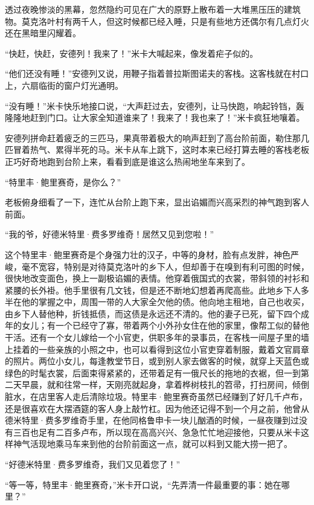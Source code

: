 \par 透过夜晚惨淡的黑幕，忽然隐约可见在广大的原野上散布着一大堆黑压压的建筑物。莫克洛叶村有两千人，但这时候都已经入睡，只是有些地方还偶尔有几点灯火还在黑暗里闪耀着。
\par “快赶，快赶，安德列！我来了！”米卡大喊起来，像发着疟子似的。
\par “他们还没有睡！”安德列又说，用鞭子指着普拉斯图诺夫的客栈。这客栈就在村口上，六扇临街的窗户灯光通明。
\par “没有睡！”米卡快乐地接口说，“大声赶过去，安德列，让马快跑，响起铃铛，轰隆隆地赶到门口。让大家全知道谁来了！我来了！我也来了！”米卡疯狂地嚷着。
\par 安德列拼命赶着疲乏的三匹马，果真带着极大的响声赶到了高台阶前面，勒住那几匹冒着热气、累得半死的马。米卡从车上跳下，这时本来已经打算去睡的客栈老板正巧好奇地跑到台阶上来，看看到底是谁这么热闹地坐车来到了。
\par “特里丰·鲍里赛奇，是你么？”
\par 老板俯身细看了一下，连忙从台阶上跑下来，显出谄媚而兴高采烈的神气跑到客人前面。
\par “我的爷，好德米特里·费多罗维奇！居然又见到您啦！”
\par 这个特里丰·鲍里赛奇是个身强力壮的汉子，中等的身材，脸有点发胖，神色严峻，毫不宽容，特别是对待莫克洛叶的乡下人，但却善于在嗅到有利可图的时候，很快地改变面色，换上一副极谄媚的表情。他穿着俄国式的衣裳，带斜领的衬衫和紧腰的长外褂。他手里很有几文钱，但是还不断地幻想着再爬高些。此地乡下人多半在他的掌握之中，周围一带的人大家全欠他的债。他向地主租地，自己也收买，由乡下人替他种，折钱抵债，而这债是永远还不清的。他的妻子已死，留下四个成年的女儿；有一个已经守了寡，带着两个小外孙女住在他的家里，像帮工似的替他干活。还有一个女儿嫁给一个小官吏，供职多年的录事员，在客栈一间屋子里的墙上挂着的一些亲族的小照之中，也可以看得到这位小官吏穿着制服，戴着文官肩章的照片。两位小女儿，每逢教堂节日，或到别人家去做客的时候，就穿上天蓝色或绿色的时髦衣裳，后面束得紧紧的，还带着足有一俄尺长的拖地的衣裾，但一到第二天早晨，就和往常一样，天刚亮就起身，拿着桦树枝扎的笤帚，打扫房间，倾倒脏水，在店里客人走后清除垃圾。特里丰·鲍里赛奇虽然已经赚到了好几千卢布，还是很喜欢在大摆酒筵的客人身上敲竹杠。因为他还记得不到一个月之前，他曾从德米特里·费多罗维奇手里，在他同格鲁申卡一块儿酗酒的时候，一昼夜赚到过没有三百也足有二百多卢布，所以现在高高兴兴、急急忙忙地迎接他，只要从米卡这样神气活现地乘马车来到他的台阶前面这一点，就可以料到又能大捞一把了。
\par “好德米特里·费多罗维奇，我们又见着您了！”
\par “等一等，特里丰·鲍里赛奇，”米卡开口说，“先弄清一件最重要的事：她在哪里？”
